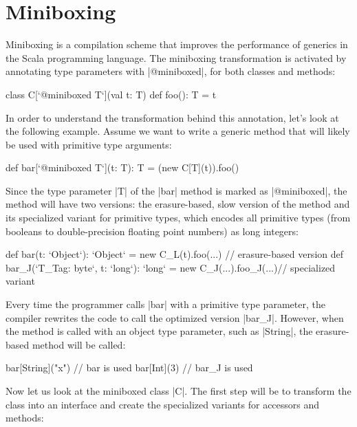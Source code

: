 \section{Miniboxing}

Miniboxing \cite{miniboxing, miniboxing-www} is a compilation scheme that improves the performance of generics in the Scala programming language. The miniboxing transformation is activated by annotating type parameters with |@miniboxed|, for both classes and methods:

\begin{lstlisting-nobreak}
 class C[`@miniboxed T`](val t: T) {
   def foo(): T = t
 }
\end{lstlisting-nobreak}

In order to understand the transformation behind this annotation, let's look at the following example. Assume we want to write a generic method that will likely be used with primitive type arguments:

\begin{lstlisting-nobreak}
 def bar[`@miniboxed T`](t: T): T =
   (new C[T](t)).foo()
\end{lstlisting-nobreak}

Since the type parameter |T| of the |bar| method is marked as |@miniboxed|, the method will have two versions: the erasure-based, slow version of the method and its specialized variant for primitive types, which encodes all primitive types (from booleans to double-precision floating point numbers) as long integers:

\begin{lstlisting-nobreak}
 def bar(t: `Object`): `Object` =
   new C_L(t).foo(...)            // erasure-based version
 def bar_J(`T_Tag: byte`, t: `long`): `long` =
   new C_J(...).foo_J(...)// specialized variant
\end{lstlisting-nobreak}

Every time the programmer calls |bar| with a primitive type parameter, the compiler rewrites the code to call the optimized version |bar_J|. However, when the method is called with an object type parameter, such as |String|, the erasure-based method will be called:

\begin{lstlisting-nobreak}
 bar[String]("x")  // bar is used
 bar[Int](3)           // bar_J is used
\end{lstlisting-nobreak}

Now let us look at the miniboxed class |C|. The first step will be to transform the class into an interface and create the specialized variants for accessors and methods:

